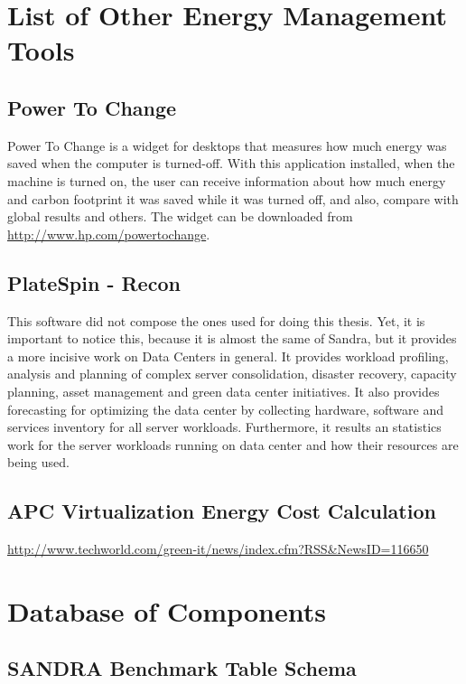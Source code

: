     
    
\chapter{List of Other Energy Management Tools} \label{app:list_other_energy_management_tools}
    \section{Power To Change} \label{app:power_to_change}
    Power To Change is a widget for desktops that measures how much energy was saved when the computer is turned-off. With this application installed, when the machine is turned on, the user can receive information about how much energy and carbon footprint it was saved while it was turned off, and also, compare with global results and others.
    The widget can be downloaded from \url{http://www.hp.com/powertochange}.

    \section{PlateSpin - Recon} \label{app:power_recon}
    This software did not compose the ones used for doing this thesis. Yet, it is important to notice this, because it is almost the same of Sandra, but it provides a more incisive work on Data Centers in general. It provides workload profiling, analysis and planning of complex server consolidation, disaster recovery, capacity planning, asset management and green data center initiatives. It also provides forecasting for optimizing the data center by collecting hardware, software and services inventory for all server workloads. Furthermore, it results an statistics work for the server workloads running on data center and how their resources are being used.
    
    \section{APC Virtualization Energy Cost Calculation}\label{app:apc_virtualization_energy_cost_calculation}
        \url{http://www.techworld.com/green-it/news/index.cfm?RSS&NewsID=116650}
    
\chapter{Database of Components} \label{app:database_components}
    \section{SANDRA Benchmark Table Schema}\label{app:sandra_benchmark_table_schema}
    
